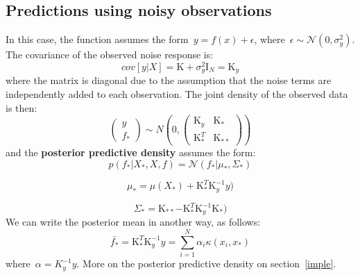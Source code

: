 \documentclass[]{IEEEtran}
\begin{document}
\subsection{Predictions using noisy observations  }
In this case, the function assumes the form~\(y=f({ x })+\epsilon \), where~\(\epsilon \sim \mathcal{N}(0,{ \sigma  }_{ y }^{ 2 })\). The covariance of the observed noise response is:
\begin{equation}
cov\left[ y|X \right] =\mathrm{K}+{ \sigma  }_{ y }^{ 2 }{ \mathrm{I}  }_{ N }={\mathrm{K} }_{ y }
\label{M15p12}
\end{equation}
where the matrix is diagonal due to the assumption that the noise terms are independently added to each observation. The joint density of the observed data is then:
\begin{equation}
\begin{pmatrix} y \\ { f }_{ * } \end{pmatrix}\sim { N }\left( 0,\begin{pmatrix} { { \mathrm{K} }_{ y } } & { { \mathrm{K} } }_{ * } \\ { { \mathrm{K} } }_{ * }^{ T } & { {\mathrm{K} } }_{ ** } \end{pmatrix} \right) 
\label{M15p13}
\end{equation}
and the \textbf{posterior predictive density} assumes the form:
\begin{equation}
p({ f }_{ * }|{ X }_{ * },X,f)={ \mathcal{N} }({ f }_{ * }|{ \mu  }_{ * },{ \Sigma  }_{ * })
\label{M15p17A}
\end{equation}

\begin{equation}
{ \mu  }_{ * }=\mu ({ X }_{ * })+{ { \mathrm{K} } }_{ * }^{ T }{ { {\mathrm{K} }_{ y }^{ -1 } } }y)
\label{M15p17B}
\end{equation}

\begin{equation}
{ \Sigma  }_{ * }={ { \mathrm{K} } }_{ ** }{ -{ { \mathrm{K} } }_{ * }^{ T } }{ \mathrm{K} }_{ y }^{ -1 }{ { \mathrm{K} } }_{ * })
\label{M15p17C}
\end{equation}
We can write the posterior mean in another way, as follows:
\begin{equation}
\bar { { f }_{ * } } = { \mathrm{K} }_{ * }^{ T }{ \mathrm{K} }_{ y }^{ -1 }y=\sum _{ i=1 }^{ N }{ { \alpha  }_{ i }\kappa ({ x }_{ i },{ x }_{ * }) } 
\label{M15p18}
\end{equation}
where~\(\alpha ={ K }_{ y }^{ -1 }y\).
More on the posterior predictive density on section~\ref{imple}.
\end{document}
